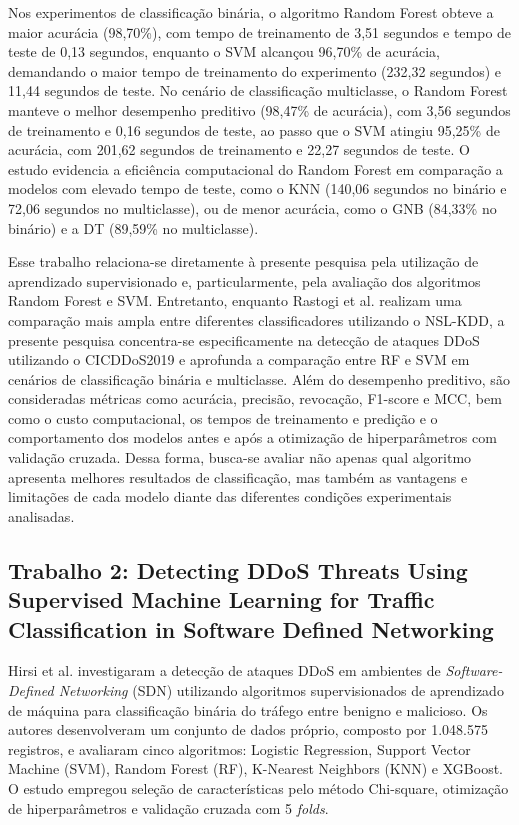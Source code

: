 \documentclass[
    12pt,                %
    openright,           %
    oneside,             %
    a4paper,             %
    english,             %
    brazil               %
]{abntex2}
\begin{document}
Nos experimentos de classificação binária, o algoritmo Random Forest obteve a maior acurácia (98,70\%), com tempo de treinamento de 3,51 segundos e tempo de teste de 0,13 segundos, enquanto o SVM alcançou 96,70\% de acurácia, demandando o maior tempo de treinamento do experimento (232,32 segundos) e 11,44 segundos de teste. No cenário de classificação multiclasse, o Random Forest manteve o melhor desempenho preditivo (98,47\% de acurácia), com 3,56 segundos de treinamento e 0,16 segundos de teste, ao passo que o SVM atingiu 95,25\% de acurácia, com 201,62 segundos de treinamento e 22,27 segundos de teste. O estudo evidencia a eficiência computacional do Random Forest em comparação a modelos com elevado tempo de teste, como o KNN (140,06 segundos no binário e 72,06 segundos no multiclasse), ou de menor acurácia, como o GNB (84,33\% no binário) e a DT (89,59\% no multiclasse).

Esse trabalho relaciona-se diretamente à presente pesquisa pela utilização de aprendizado supervisionado e, particularmente, pela avaliação dos algoritmos Random Forest e SVM. Entretanto, enquanto Rastogi et al. \cite{rastogi2022} realizam uma comparação mais ampla entre diferentes classificadores utilizando o NSL-KDD, a presente pesquisa concentra-se especificamente na detecção de ataques DDoS utilizando o CICDDoS2019 e aprofunda a comparação entre RF e SVM em cenários de classificação binária e multiclasse. Além do desempenho preditivo, são consideradas métricas como acurácia, precisão, revocação, F1-score e MCC, bem como o custo computacional, os tempos de treinamento e predição e o comportamento dos modelos antes e após a otimização de hiperparâmetros com validação cruzada. Dessa forma, busca-se avaliar não apenas qual algoritmo apresenta melhores resultados de classificação, mas também as vantagens e limitações de cada modelo diante das diferentes condições experimentais analisadas.

\subsection{Trabalho 2: Detecting DDoS Threats Using Supervised Machine Learning for Traffic Classification in Software Defined Networking}

Hirsi et al. \cite{hirsi2024} investigaram a detecção de ataques DDoS em ambientes de \textit{Software-Defined Networking} (SDN) utilizando algoritmos supervisionados de aprendizado de máquina para classificação binária do tráfego entre benigno e malicioso. Os autores desenvolveram um conjunto de dados próprio, composto por 1.048.575 registros, e avaliaram cinco algoritmos: Logistic Regression, Support Vector Machine (SVM), Random Forest (RF), K-Nearest Neighbors (KNN) e XGBoost. O estudo empregou seleção de características pelo método Chi-square, otimização de hiperparâmetros e validação cruzada com 5 \textit{folds}.
\end{document}

